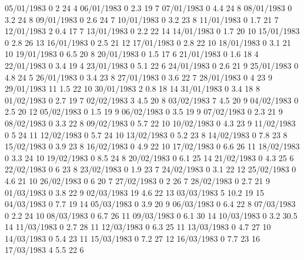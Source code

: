 05/01/1983  0      2      24     4 
06/01/1983  0      2.3    19     7 
07/01/1983  0      4.4    24     8 
08/01/1983  0      3.2    24     8 
09/01/1983  0      2.6    24     7 
10/01/1983  0      3.2    23     8 
11/01/1983  0      1.7    21     7 
12/01/1983  2      0.4    17     7 
13/01/1983  0      2.2    22     14 
14/01/1983  0      1.7    20     10 
15/01/1983  0      2.8    26     13 
16/01/1983  0      2.5    21     12 
17/01/1983  0      2.8    22     10 
18/01/1983  0      3.1    21     10 
19/01/1983  0      6.5    20     8 
20/01/1983  0      1.5    17     6 
21/01/1983  0      1.6    18     4 
22/01/1983  0      3.4    19     4 
23/01/1983  0      5.1    22     6 
24/01/1983  0      2.6    21     9 
25/01/1983  0      4.8    24     5 
26/01/1983  0      3.4    23     8 
27/01/1983  0      3.6    22     7 
28/01/1983  0      4      23     9 
29/01/1983  11     1.5    22     10 
30/01/1983  2      0.8    18     14 
31/01/1983  0      3.4    18     8 
01/02/1983  0      2.7    19     7 
02/02/1983  3      4.5    20     8 
03/02/1983  7      4.5    20     9 
04/02/1983  0      2.5    20     12 
05/02/1983  0      1.5    19     9 
06/02/1983  0      3.5    19     9 
07/02/1983  0      2.3    21     9 
08/02/1983  0      3.3    22     8 
09/02/1983  0      5.7    22     10 
10/02/1983  0      4.3    23     9 
11/02/1983  0      5      24     11 
12/02/1983  0      5.7    24     10 
13/02/1983  0      5.2    23     8 
14/02/1983  0      7.8    23     8 
15/02/1983  0      3.9    23     8 
16/02/1983  0      4.9    22     10 
17/02/1983  0      6.6    26     11 
18/02/1983  0      3.3    24     10 
19/02/1983  0      8.5    24     8 
20/02/1983  0      6.1    25     14 
21/02/1983  0      4.3    25     6 
22/02/1983  0      6      23     8 
23/02/1983  0      1.9    23     7 
24/02/1983  0      3.1    22     12 
25/02/1983  0      4.6    21     10 
26/02/1983  0      6      20     7 
27/02/1983  0      2      26     7 
28/02/1983  0      2.7    21     9 
01/03/1983  0      3.8    22     9 
02/03/1983  19     4.6    22     13 
03/03/1983  5      10.2   19     15 
04/03/1983  0      7.7    19     14 
05/03/1983  0      3.9    20     9 
06/03/1983  0      6.4    22     8 
07/03/1983  0      2.2    24     10 
08/03/1983  0      6.7    26     11 
09/03/1983  0      6.1    30     14 
10/03/1983  0      3.2    30.5   14 
11/03/1983  0      2.7    28     11 
12/03/1983  0      6.3    25     11 
13/03/1983  0      4.7    27     10 
14/03/1983  0      5.4    23     11 
15/03/1983  0      7.2    27     12 
16/03/1983  0      7.7    23     16 
17/03/1983  4      5.5    22     6 
